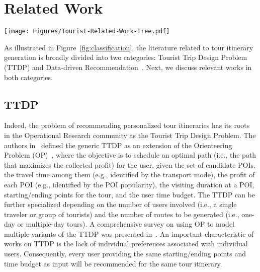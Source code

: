 \section{Related Work}\label{sec:related-work}

\begin{figure*}[t]
\centering
\texttt{[image: Figures/Tourist-Related-Work-Tree.pdf]}
\caption{{Tree of classification for tour-related research. Adapted from~\cite{lim-tour:18}. Yellow boxes indicate the topic of interest.}}
\label{fig:classification}
\end{figure*}

{As illustrated in Figure~\ref{fig:classification}, the literature related to tour itinerary generation is broadly divided into two categories: Tourist Trip Design Problem (TTDP) and Data-driven Recommendation~\cite{lim-tour:18}. Next, we discuss relevant works in both categories.}

{\subsection{TTDP}
Indeed, the problem of recommending personalized tour itineraries has its roots in the Operational Research community as the Tourist Trip Design Problem. The authors in~\cite{vansteenwegen-mobile:07} defined the generic TTDP as an extension of the Orienteering Problem (OP)~\cite{vansteenwegen-orienteering:11}, where the objective is to schedule an optimal path (i.e., the path that maximizes the collected profit) for the user, given the set of candidate POIs, the travel time among them (e.g., identified by the transport mode), the profit of each POI (e.g., identified by the POI popularity), the visiting duration at a POI, starting/ending points for the tour, and the user time budget. The TTDP can be further specialized depending on the number of users involved (i.e., a single traveler or group of tourists) and the number of routes to be generated (i.e., one-day or multiple-day tours). A comprehensive survey on using OP to model multiple variants of the TTDP was presented in~\cite{gavalas-survey:14}. An important characteristic of works on TTDP is the lack of individual preferences associated with individual users. Consequently, every user providing the same starting/ending points and time budget as input will be recommended for the same tour itinerary.}

